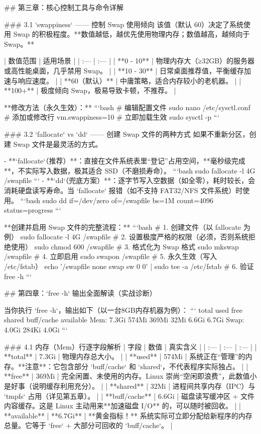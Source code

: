 ## 第三章：核心控制工具与命令详解

### 3.1 `swappiness` —— 控制 Swap 使用倾向
该值（默认 60）决定了系统使用 Swap 的积极程度。**数值越低，越优先使用物理内存；数值越高，越倾向于 Swap。**

| 数值范围 | 适用场景 |
| :--- | :--- |
| **0 - 10** | 物理内存大（≥32GB）的服务器或高性能桌面，几乎禁用 Swap。 |
| **10 - 30** | 日常桌面推荐值，平衡缓存加速与响应速度。 |
| **60（默认）** | 中庸策略，适合内存较小的老机器。 |
| **100+** | 极度倾向 Swap，极易导致卡顿，不推荐。 |

**修改方法（永久生效）：**
```bash
# 编辑配置文件
sudo nano /etc/sysctl.conf
# 添加或修改行
vm.swappiness=10
# 立即加载生效
sudo sysctl -p
```

### 3.2 `fallocate` vs `dd` —— 创建 Swap 文件的两种方式
如果不重新分区，创建 Swap 文件是最灵活的方式。

-   **`fallocate`（推荐）**：直接在文件系统表里“登记”占用空间，**毫秒级完成**，不实际写入数据，极其适合 SSD（不磨损寿命）。
    ```bash
    sudo fallocate -l 4G /swapfile
    ```
-   **`dd`（兜底方案）**：逐字节写入空数据（如全零），耗时较长，会消耗硬盘读写寿命。当 `fallocate` 报错（如不支持 FAT32/NFS 文件系统）时使用。
    ```bash
    sudo dd if=/dev/zero of=/swapfile bs=1M count=4096 status=progress
    ```

**创建并启用 Swap 文件的完整流程：**
```bash
# 1. 创建文件（以 fallocate 为例）
sudo fallocate -l 4G /swapfile
# 2. 设置极度严格的权限（必须，否则系统拒绝使用）
sudo chmod 600 /swapfile
# 3. 格式化为 Swap 格式
sudo mkswap /swapfile
# 4. 立即启用
sudo swapon /swapfile
# 5. 永久生效（写入 /etc/fstab）
echo '/swapfile none swap sw 0 0' | sudo tee -a /etc/fstab
# 6. 验证
free -h
```


## 第四章：`free -h` 输出全面解读（实战诊断）

当你执行 `free -h`，输出如下（以一台8GB内存机器为例）：
```
               total        used        free      shared  buff/cache   available
Mem:           7.3Gi       574Mi       369Mi        32Mi       6.6Gi       6.7Gi
Swap:          4.0Gi       284Ki       4.0Gi
```

### 4.1 内存（Mem）行逐字段解析
| 字段 | 数值 | 真实含义 |
| :--- | :--- | :--- |
| **total** | 7.3Gi | 物理内存总大小。 |
| **used** | 574Mi | 系统正在“管理”的内存。**注意**：它包含部分 `buff/cache` 和 `shared`，不代表程序实际独占。 |
| **free** | 369Mi | 完全闲置、未使用的内存。Linux 崇尚“空闲即浪费”，此数值小是好事（说明缓存利用充分）。 |
| **shared** | 32Mi | 进程间共享内存（IPC）与 `tmpfs` 占用（详见第五章）。 |
| **buff/cache** | 6.6Gi | 磁盘读写缓冲区 + 文件内容缓存。这是 Linux 主动用来**加速磁盘 I/O** 的，可以随时被回收。 |
| **available** | **6.7Gi** | **黄金指标！** 系统实际可立即分配给新程序的内存总量。它等于 `free` + 大部分可回收的 `buff/cache`。 |

